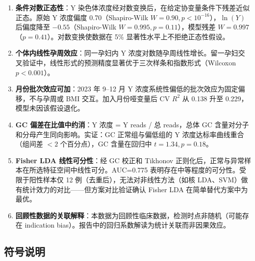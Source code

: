 \documentclass{mcm-paper}
\begin{document}
\begin{enumerate}
    \item \textbf{条件对数正态性}：Y 染色体浓度经对数变换后，在给定协变量条件下残差近似正态。原始 Y 浓度偏度 0.70（Shapiro-Wilk $W=0.90, p<10^{-16}$），$\ln(Y)$ 后偏度降至 $-0.55$（Shapiro-Wilk $W=0.995, p=0.11$），模型残差 $W=0.997$（$p=0.41$）。对数变换使数据在 5\% 显著性水平上不拒绝正态性假设。

    \item \textbf{个体内线性孕周效应}：同一孕妇内 Y 浓度对数随孕周线性增长。留一孕妇交叉验证中，线性形式的预测精度显著优于三次样条和指数形式（Wilcoxon $p<0.001$）。

    \item \textbf{月份批次效应可加}：2023 年 9--12 月 Y 浓度系统性偏低的批次效应为固定偏移，不与孕周或 BMI 交互。加入月份哑变量后 CV $R^2$ 从 0.138 升至 0.229，模型未因该假设退化。

    \item \textbf{GC 偏差在比值中约消}：Y 浓度 = Y reads / 总 reads，总体 GC 含量对分子和分母产生同向影响。实证：GC 正常组与偏低组的 Y 浓度达标率曲线重合（组间差 $<2$ 个百分点），GC 含量在回归中 $t=1.34, p=0.18$。

    \item \textbf{Fisher LDA 线性可分性}：经 GC 校正和 Tikhonov 正则化后，正常与异常样本在所选特征空间中线性可分。AUC=0.775 表明存在中等程度的可分性。受限于阳性样本仅 12 例（去重后），无法对非线性方法（如核 LDA、SVM）做有统计效力的对比——但方案对比验证确认 Fisher LDA 在简单替代方案中为最优。

    \item \textbf{回顾性数据的关联解释}：本数据为回顾性临床数据，检测时点非随机（可能存在 indication bias）。报告中的回归系数解读为统计关联而非因果效应。
\end{enumerate}

\subsection{符号说明}
\end{document}
